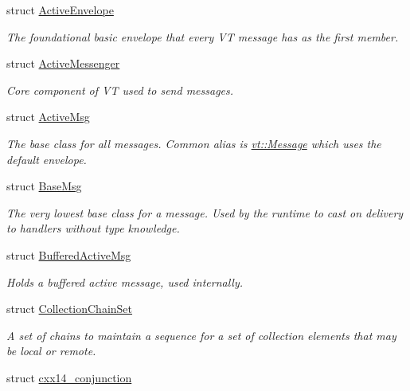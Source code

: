 \begin{DoxyCompactItemize}
\item 
struct \hyperlink{structvt_1_1messaging_1_1_active_envelope}{Active\+Envelope}
\begin{DoxyCompactList}\small\item\em The foundational basic envelope that every VT message has as the first member. \end{DoxyCompactList}\item 
struct \hyperlink{structvt_1_1messaging_1_1_active_messenger}{Active\+Messenger}
\begin{DoxyCompactList}\small\item\em Core component of VT used to send messages. \end{DoxyCompactList}\item 
struct \hyperlink{structvt_1_1messaging_1_1_active_msg}{Active\+Msg}
\begin{DoxyCompactList}\small\item\em The base class for all messages. Common alias is {\ttfamily \hyperlink{namespacevt_a3a3ddfef40b4c90915fa43cdd5f129ea}{vt\+::\+Message}} which uses the default envelope. \end{DoxyCompactList}\item 
struct \hyperlink{structvt_1_1messaging_1_1_base_msg}{Base\+Msg}
\begin{DoxyCompactList}\small\item\em The very lowest base class for a message. Used by the runtime to cast on delivery to handlers without type knowledge. \end{DoxyCompactList}\item 
struct \hyperlink{structvt_1_1messaging_1_1_buffered_active_msg}{Buffered\+Active\+Msg}
\begin{DoxyCompactList}\small\item\em Holds a buffered active message, used internally. \end{DoxyCompactList}\item 
struct \hyperlink{classvt_1_1messaging_1_1_collection_chain_set}{Collection\+Chain\+Set}
\begin{DoxyCompactList}\small\item\em A set of chains to maintain a sequence for a set of collection elements that may be local or remote. \end{DoxyCompactList}\item 
struct \hyperlink{structvt_1_1messaging_1_1cxx14__conjunction}{cxx14\+\_\+conjunction}
\item 

\end{DoxyCompactItemize}
